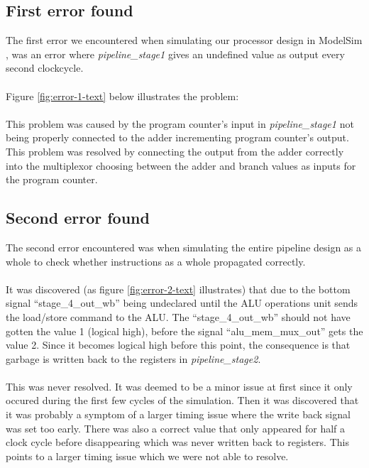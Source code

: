 \subsection{First error found}
The first error we encountered when simulating our processor design in ModelSim
\cite{modelsim}, was an error where \emph{pipeline\_stage1} gives an undefined
value as output every second clockcycle.
\paragraph*{}
Figure \ref{fig:error-1-text} below illustrates the problem:

\paragraph*{}
This problem was caused by the program counter's input in
\emph{pipeline\_stage1} not being properly connected to the adder incrementing
program counter's output. This problem was resolved by connecting the output
from the adder correctly into the multiplexor choosing between the adder and
branch values as inputs for the program counter.

\subsection{Second error found}
The second error encountered was when simulating the entire pipeline design as
a whole to check whether instructions as a whole propagated correctly.
\paragraph*{}
It was discovered (as figure \ref{fig:error-2-text} illustrates) that due to the
bottom signal ``stage\_4\_out\_wb'' being undeclared until the ALU operations unit
sends the load/store command to the ALU. The ``stage\_4\_out\_wb'' should not
have gotten the value 1 (logical high), before the signal ``alu\_mem\_mux\_out''
gets the value 2. Since it becomes logical high before this point, the
consequence is that garbage is written back to the registers in
\emph{pipeline\_stage2}.

\paragraph*{}
This was never resolved. It was deemed to be a minor issue at first since it only occured during the first few cycles of the simulation. Then it was discovered that it was probably a symptom of a larger timing issue where the write back signal was set too early. There was also a correct value that only appeared for half a clock cycle before disappearing which was never written back to registers. This points to a larger timing issue which we were not able to resolve.

